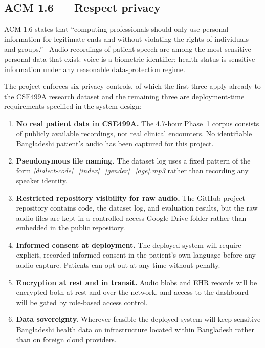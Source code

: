 \documentclass[12pt,a4paper]{article}
\begin{document}
\subsection{ACM 1.6 --- Respect privacy}

ACM 1.6 states that ``computing professionals should only use
personal information for legitimate ends and without violating the
rights of individuals and groups.''~\cite{eth:acm2018} Audio
recordings of patient speech are among the most sensitive personal
data that exist: voice is a biometric identifier; health status is
sensitive information under any reasonable data-protection regime.

The project enforces six privacy controls, of which the first
three apply already to the CSE499A research dataset and the
remaining three are deployment-time requirements specified in the
system design:

\begin{enumerate}[leftmargin=*]
\item \textbf{No real patient data in CSE499A.} The 4.7-hour Phase~1
corpus consists of publicly available recordings, not real clinical
encounters. No identifiable Bangladeshi patient's audio has been
captured for this project.
\item \textbf{Pseudonymous file naming.} The dataset log uses a
fixed pattern of the form
\textit{[dialect-code]\_[index]\_[gender]\_[age].mp3}
rather than recording any speaker identity.
\item \textbf{Restricted repository visibility for raw audio.} The
GitHub project repository contains code, the dataset log, and
evaluation results, but the raw audio files are kept in a
controlled-access Google Drive folder rather than embedded in the
public repository.
\item \textbf{Informed consent at deployment.} The deployed system
will require explicit, recorded informed consent in the patient's
own language before any audio capture. Patients can opt out at any
time without penalty.
\item \textbf{Encryption at rest and in transit.} Audio blobs and
EHR records will be encrypted both at rest and over the network,
and access to the dashboard will be gated by role-based access
control.
\item \textbf{Data sovereignty.} Wherever feasible the deployed
system will keep sensitive Bangladeshi health data on
infrastructure located within Bangladesh rather than on foreign
cloud providers.
\end{enumerate}
\end{document}
